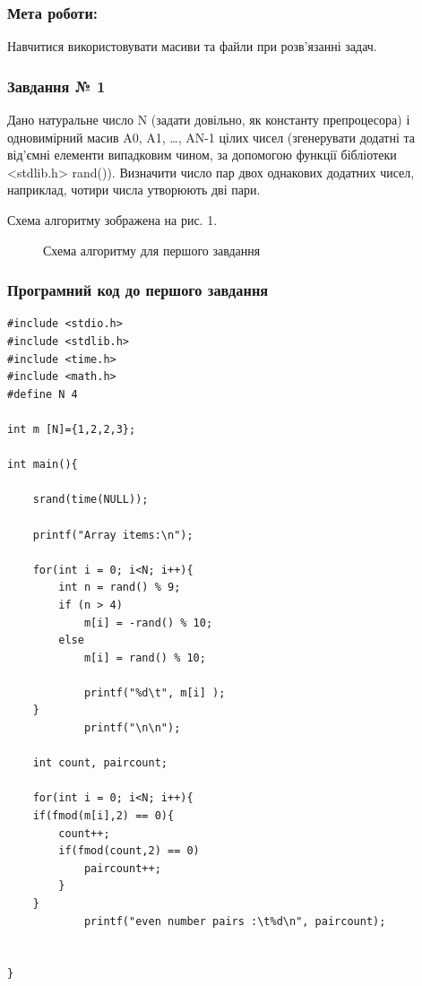 \documentclass[14pt]{extreport}
\begin{document}
\subsubsection*{Мета роботи:}

Навчитися використовувати масиви та файли при розв’язанні задач.

\bigskip


\subsubsection*{Завдання № 1}
Дано натуральне число N (задати довільно, як константу препроцесора)
і одновимірний масив A0, A1, …, AN-1 цілих чисел (згенерувати додатні
та від’ємні
елементи випадковим чином, за допомогою функції бібліотеки <stdlib.h>
rand()). Визначити число пар двох однакових додатних чисел, наприклад, чотири
числа утворюють дві пари.

Схема алгоритму зображена на рис. 1.

\begin{figure}[h]
	\centering
	
	\caption{Схема алгоритму для першого завдання}
\end{figure}

\subsubsection*{Програмний код до першого завдання}

\begin{lstlisting}[frame=single]
#include <stdio.h>
#include <stdlib.h>
#include <time.h>
#include <math.h>
#define N 4

int m [N]={1,2,2,3};

int main(){

	srand(time(NULL));

	printf("Array items:\n");

	for(int i = 0; i<N; i++){
		int n = rand() % 9;
		if (n > 4)
			m[i] = -rand() % 10;
		else
			m[i] = rand() % 10;

			printf("%d\t", m[i] );
	}
			printf("\n\n");

	int count, paircount;

	for(int i = 0; i<N; i++){
	if(fmod(m[i],2) == 0){
		count++;
		if(fmod(count,2) == 0)
			paircount++;
		}
	}
			printf("even number pairs :\t%d\n", paircount);


}

\end{lstlisting}
\end{document}
